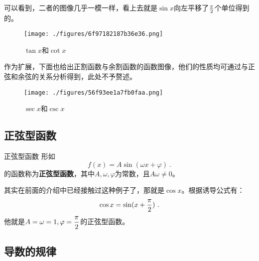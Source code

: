 可以看到，二者的图像几乎一模一样，看上去就是$\sin x$向左平移了${\pi\over2}$个单位得到的。

\begin{figure}[ht]
\centering
\texttt{[image: ./figures/6f97182187b36e36.png]}
\caption{$\tan x$和$\cot x$} \label{fig_HsTFFv_3}
\end{figure}

作为扩展，下面也给出正割函数与余割函数的函数图像，他们的性质均可通过与正弦和余弦的关系分析得到，此处不予赘述。

\begin{figure}[ht]
\centering
\texttt{[image: ./figures/56f93ee1a7fb0faa.png]}
\caption{$\sec x$和$\csc x$} \label{fig_HsTFFv_2}
\end{figure}


\subsection{正弦型函数}

\begin{definition}{正弦型函数}
形如
\begin{equation}
f(x)=A\sin(\omega x+\varphi)~.
\end{equation}
的函数称为\textbf{正弦型函数}，其中$A,\omega,\varphi$为常数，且$A\omega\neq0$。
\end{definition}
其实在前面的介绍中已经接触过这种例子了，那就是$\cos x$。根据诱导公式有：
\begin{equation}
\cos x=\sin(x+{\pi\over2})~.
\end{equation}
他就是$\displaystyle A=\omega=1,\varphi={\pi\over2}$的正弦型函数。


\subsection{导数的规律}